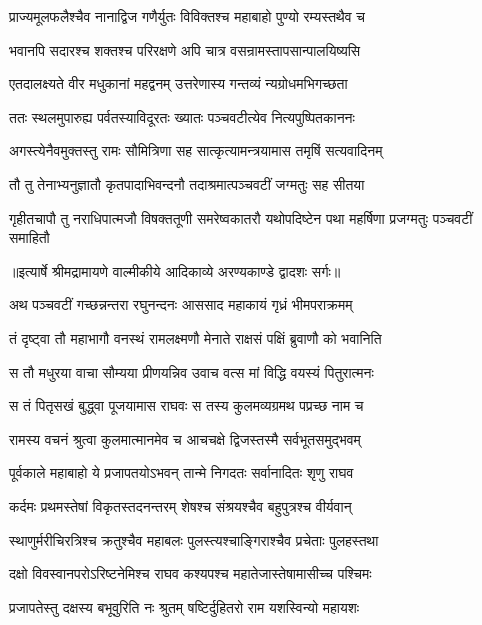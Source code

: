 \twolineshloka
{प्राज्यमूलफलैश्चैव नानाद्विज गणैर्युतः}
{विविक्तश्च महाबाहो पुण्यो रम्यस्तथैव च} %

\twolineshloka
{भवानपि सदारश्च शक्तश्च परिरक्षणे}
{अपि चात्र वसन्रामस्तापसान्पालयिष्यसि} %

\twolineshloka
{एतदालक्ष्यते वीर मधुकानां महद्वनम्}
{उत्तरेणास्य गन्तव्यं न्यग्रोधमभिगच्छता} %

\twolineshloka
{ततः स्थलमुपारुह्य पर्वतस्याविदूरतः}
{ख्यातः पञ्चवटीत्येव नित्यपुष्पितकाननः} %

\twolineshloka
{अगस्त्येनैवमुक्तस्तु रामः सौमित्रिणा सह}
{सात्कृत्यामन्त्रयामास तमृषिं सत्यवादिनम्} %

\twolineshloka
{तौ तु तेनाभ्यनुज्ञातौ कृतपादाभिवन्दनौ}
{तदाश्रमात्पञ्चवटीं जग्मतुः सह सीतया} %

\fourlineindentedshloka
{गृहीतचापौ तु नराधिपात्मजौ}
{ विषक्ततूणी समरेष्वकातरौ}
{यथोपदिष्टेन पथा महर्षिणा}
{ प्रजग्मतुः पञ्चवटीं समाहितौ} %


{॥इत्यार्षे श्रीमद्रामायणे वाल्मीकीये आदिकाव्ये अरण्यकाण्डे द्वादशः सर्गः॥}


\twolineshloka
{अथ पञ्चवटीं गच्छन्नन्तरा रघुनन्दनः}
{आससाद महाकायं गृध्रं भीमपराक्रमम्} %

\twolineshloka
{तं दृष्ट्वा तौ महाभागौ वनस्थं रामलक्ष्मणौ}
{मेनाते राक्षसं पक्षिं ब्रुवाणौ को भवानिति} %

\twolineshloka
{स तौ मधुरया वाचा सौम्यया प्रीणयन्निव}
{उवाच वत्स मां विद्धि वयस्यं पितुरात्मनः} %

\twolineshloka
{स तं पितृसखं बुद्ध्वा पूजयामास राघवः}
{स तस्य कुलमव्यग्रमथ पप्रच्छ नाम च} %

\twolineshloka
{रामस्य वचनं श्रुत्वा कुलमात्मानमेव च}
{आचचक्षे द्विजस्तस्मै सर्वभूतसमुद्भवम्} %

\twolineshloka
{पूर्वकाले महाबाहो ये प्रजापतयोऽभवन्}
{तान्मे निगदतः सर्वानादितः शृणु राघव} %

\twolineshloka
{कर्दमः प्रथमस्तेषां विकृतस्तदनन्तरम्}
{शेषश्च संश्रयश्चैव बहुपुत्रश्च वीर्यवान्} %

\twolineshloka
{स्थाणुर्मरीचिरत्रिश्च क्रतुश्चैव महाबलः}
{पुलस्त्यश्चाङ्गिराश्चैव प्रचेताः पुलहस्तथा} %

\twolineshloka
{दक्षो विवस्वानपरोऽरिष्टनेमिश्च राघव}
{कश्यपश्च महातेजास्तेषामासीच्च पश्चिमः} %

\twolineshloka
{प्रजापतेस्तु दक्षस्य बभूवुरिति नः श्रुतम्}
{षष्टिर्दुहितरो राम यशस्विन्यो महायशः} %

